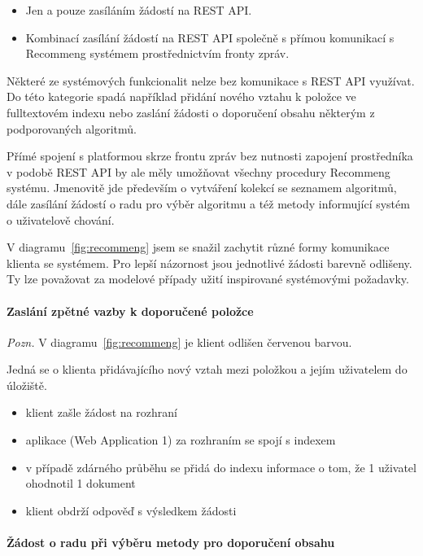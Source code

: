 \documentclass[thesis=M,czech]{FITthesis}[2014/05/07]
\begin{document}
\begin{itemize}
	\item Jen a pouze zasíláním žádostí na REST API.
	\item Kombinací zasílání žádostí na REST API společně s přímou komunikací s Recommeng systémem prostřednictvím fronty zpráv.
\end{itemize}

Některé ze systémových funkcionalit nelze bez komunikace s REST API využívat. Do této kategorie spadá například přidání nového vztahu k položce ve fulltextovém indexu nebo zaslání žádosti o doporučení obsahu některým z podporovaných algoritmů. 

Přímé spojení s platformou skrze frontu zpráv bez nutnosti zapojení prostředníka v podobě REST API by ale měly umožňovat všechny procedury Recommeng systému. Jmenovitě jde především o vytváření kolekcí se seznamem algoritmů, dále zasílání žádostí o radu pro výběr algoritmu a též metody informující systém o uživatelově chování.

V diagramu~\ref{fig:recommeng} jsem se snažil zachytit různé formy komunikace klienta se systémem. Pro lepší názornost jsou jednotlivé žádosti barevně odlišeny. Ty lze považovat za modelové případy užití inspirované systémovými požadavky.

\paragraph{Zaslání zpětné vazby k doporučené položce}
\emph{Pozn.} V diagramu~\ref{fig:recommeng} je klient odlišen červenou barvou. 

Jedná se o klienta přidávajícího nový vztah mezi položkou a jejím uživatelem do úložiště.

\begin{itemize}
	\item klient zašle žádost na rozhraní
	\item aplikace (Web Application 1) za rozhraním se spojí s indexem
	\item v případě zdárného průběhu se přidá do indexu informace o tom, že 1 uživatel ohodnotil 1 dokument
	\item klient obdrží odpověď s výsledkem žádosti
\end{itemize}

\paragraph{Žádost o radu při výběru metody pro doporučení obsahu}
\label{subsub:purple}
\end{document}
